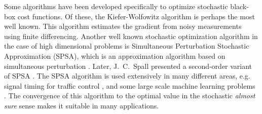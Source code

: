 Some algorithms have been developed specifically to optimize stochastic black-box cost functions. Of these, the Kiefer-Wolfowitz algorithm \cite{kiefer1952stochastic} is perhaps the most well known. This algorithm estimates the gradient from noisy measurements using finite differencing. Another well known stochastic optimization algorithm in the case of high dimensional problems is Simultaneous Perturbation Stochastic Approximation (SPSA), which is an approximation algorithm based on simultaneous perturbation \cite{spall1992multivariate}. Later, J.~C.~Spall presented a second-order variant of SPSA \cite{spall2000adaptive}. The SPSA algorithm is used extensively in many different areas, e.g.\, signal timing for traffic control \cite{ma2013solving}, and some large scale machine learning problems \cite{byrd2011use}. The convergence of this algorithm to the optimal value in the stochastic \emph{almost sure} sense makes it suitable in many applications.

